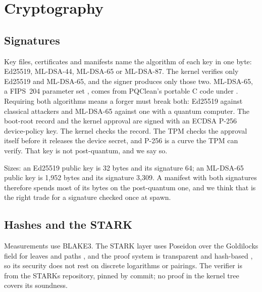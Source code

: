 \section{Cryptography}\label{sec:crypto}

\subsection{Signatures}

Key files, certificates and manifests name the algorithm of each key in one byte: Ed25519, ML-DSA-44, ML-DSA-65 or ML-DSA-87. The kernel verifies only Ed25519 and ML-DSA-65, and the signer produces only those two. ML-DSA-65, a FIPS~204 parameter set \cite{fips204}, comes from PQClean's portable C code under . Requiring both algorithms means a forger must break both: Ed25519 against classical attackers and ML-DSA-65 against one with a quantum computer. The boot-root record and the kernel approval are signed with an ECDSA P-256 device-policy key. The kernel checks the record. The TPM checks the approval itself before it releases the device secret, and P-256 is a curve the TPM can verify. That key is not post-quantum, and we say so.

Sizes: an Ed25519 public key is 32 bytes and its signature 64; an ML-DSA-65 public key is 1,952 bytes and its signature 3,309. A manifest with both signatures therefore spends most of its bytes on the post-quantum one, and we think that is the right trade for a signature checked once at spawn.

\subsection{Hashes and the STARK}

Measurements use BLAKE3. The STARK layer uses Poseidon over the Goldilocks field for leaves and paths \cite{poseidon}, and the proof system is transparent and hash-based \cite{stark,fri}, so its security does not rest on discrete logarithms or pairings. The verifier is  from the STARKs repository, pinned by commit; no proof in the kernel tree covers its soundness.

